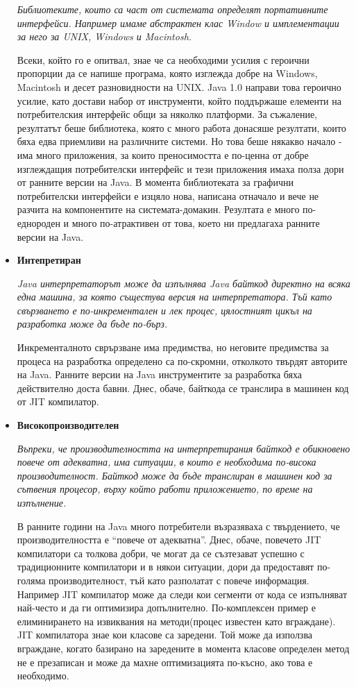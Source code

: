 \begin{itemize}
    \emph{Библиотеките, които са част от системата определят портативните
    интерфейси. Например имаме абстрактен клас Window и имплементации за
    него за UNIX, Windows и Macintosh.}

    Всеки, който го е опитвал, знае че са необходими усилия с героични
    пропорции да се напише програма, която изглежда добре на Windows,
    Macintosh и десет разновидности на UNIX. Java 1.0 направи това
    героично усилие, като достави набор от инструменти, който поддържаше
    елементи на потребителския интерфейс общи за няколко платформи. За
    съжаление, резултатът беше библиотека, която с много работа донасяше
    резултати, които бяха едва приемливи на различните системи. Но това
    беше някакво начало - има много приложения, за които преносимостта е
    по-ценна от добре изглеждащия потребителски интерфейс и тези
    приложения имаха полза дори от ранните версии на Java. В момента
    библиотеката за графични потребителски интерфейси е изцяло нова,
    написана отначало и вече не разчита на компонентите на
    системата-домакин. Резултата е много по-еднороден и много
    по-атрактивен от това, което ни предлагаха ранните версии на Java. 

  \item \textbf{Интепретиран}

    \emph{Java интерпретаторът може да изпълнява Java байткод директно на всяка
    една машина, за която същестува версия на интерпретатора. Тъй като
    свързването е по-инкрементален и лек процес, цялостният цикъл на
    разработка може да бъде по-бърз.}

    Инкременталното сврързване има предимства, но неговите предимства за
    процеса на разработка определено са по-скромни, отколкото твърдят
    авторите на Java. Ранните версии на Java инструментите за разработка
    бяха действително доста бавни. Днес, обаче, байткода се транслира в
    машинен код от JIT компилатор.
  \item \textbf{Високопроизводителен}

    \emph{Въпреки, че производителността на интерпретирания байткод е
    обикновено повече от адекватна, има ситуации, в които е необходима
    по-висока производителност. Байткод може да бъде транслиран в
    машинен код за сътвения процесор, върху който работи приложението,
    по време на изпълнение.}

    В ранните години на Java много потребители възразяваха с
    твърдението, че производителността е "`повече от
    адекватна"'. Днес, обаче, повечето JIT компилатори са толкова
    добри, че могат да се съзтезават успешно с традиционните
    компилатори и в някои ситуации, дори да предоставят по-голяма
    производителност, тъй като разполатат с повече
    информация. Например JIT компилатор може да следи кои сегменти от
    кода се изпълняват най-често и да ги оптимизира
    допълнително. По-комплексен пример е елиминирането на извиквания
    на методи(процес известен като вграждане). JIT компилатора знае
    кои класове са заредени. Той може да използва вграждане, когато
    базирано на заредените в момента класове определен метод не е
    презаписан и може да махне оптимизацията по-късно, ако това е необходимо.  


\end{itemize}
